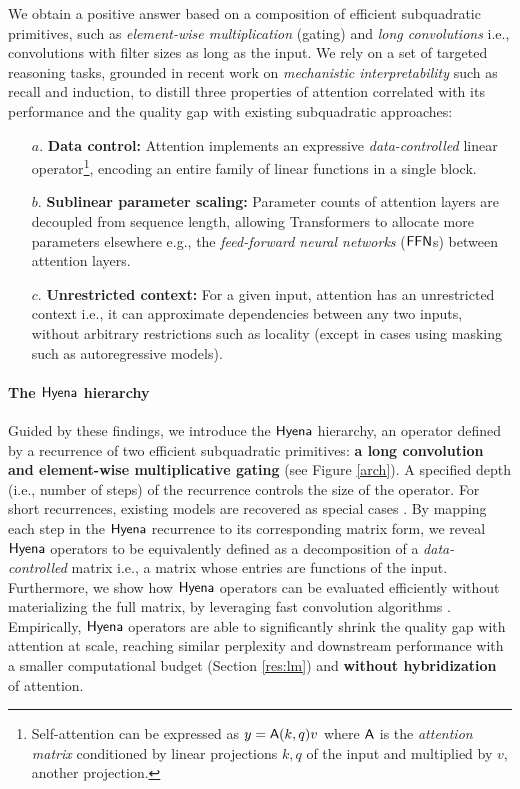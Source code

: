 We obtain a positive answer based on a composition of efficient subquadratic primitives, such as \textit{element-wise multiplication} (gating) and \textit{long convolutions} i.e., convolutions with filter sizes as long as the input. We rely on a set of targeted reasoning tasks, grounded in recent work on \textit{mechanistic interpretability} \citep{elhage2021mathematical,power2022grokking,olsson2022context,zhang2022unveiling} such as recall and induction, to distill three properties of attention correlated with its performance and the quality gap with existing subquadratic approaches: 
%
\begin{itemize}[leftmargin=0.1in]
    \item[$a.$] \textbf{Data control:} Attention implements an expressive \textit{data-controlled} \citep{massaroli2020dissecting} linear operator\footnote{Self-attention can be expressed as $y = \mathsf{A}(k, q) v$ where $\mathsf{A}$ is the \textit{attention matrix} conditioned by linear projections $k, q$ of the input and multiplied by $v$, another projection.}, encoding an entire family of linear functions in a single block.
    \item[$b.$] \textbf{Sublinear parameter scaling:} Parameter counts of attention layers are decoupled from sequence length, allowing Transformers to allocate more parameters elsewhere e.g., the \textit{feed-forward neural networks} ({$\sf FFN$s}) between attention layers.
    \item[$c.$] \textbf{Unrestricted context:} For a given input, attention has an unrestricted context i.e., it can approximate dependencies between any two inputs, without arbitrary restrictions such as locality (except in cases using masking such as autoregressive models).
\end{itemize}
%
\paragraph{The ${\sf Hyena}$ hierarchy}
%
Guided by these findings, we introduce the ${\sf Hyena}$ hierarchy, an operator defined by a recurrence of two efficient subquadratic primitives: \textbf{a long convolution and element-wise multiplicative gating} (see Figure \ref{arch}). A specified depth (i.e., number of steps) of the recurrence controls the size of the operator. For short recurrences, existing models are recovered as special cases \citep{mehta2022long,dao2022hungry}. By mapping each step in the ${\sf Hyena}$ recurrence to its corresponding matrix form, we reveal ${\sf Hyena}$ operators to be equivalently defined as a decomposition of a \textit{data-controlled} matrix i.e., a matrix whose entries are functions of the input. Furthermore, we show how ${\sf Hyena}$ operators can be evaluated efficiently without materializing the full matrix, by leveraging fast convolution algorithms \citep{selesnick2017fast}. Empirically, ${\sf Hyena}$ operators are able to significantly shrink the quality gap with attention at scale, reaching similar perplexity and downstream performance with a smaller computational budget (Section \ref{res:lm}) and \textbf{without hybridization} of attention.
%

